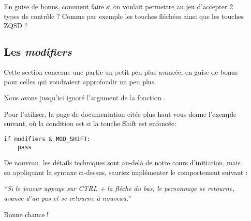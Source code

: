 En guise de bonus, comment faire si on voulait permettre au jeu d'accepter 2 types de contrôle ? Comme par exemple les touches fléchées ainsi que les touches ZQSD ?

\subsection{Les \emph{modifiers}}

Cette section concerne une partie un petit peu plus avancée, en guise de bonus pour celles qui voudraient approfondir un peu plus.

Nous avons jusqu'ici ignoré l'argument  de la fonction .

Pour l'utiliser, la page de documentation citée plus haut vous donne l'exemple suivant, où la condition est  si la touche Shift est enfoncée:

\begin{lstlisting}
if modifiers & MOD_SHIFT:
    pass
\end{lstlisting}

De nouveau, les détails techniques sont au-delà de notre cours d'initiation, mais en appliquant la syntaxe ci-dessus, sauriez implémenter le comportement suivant :

\begin{center}
\emph{``Si le joueur appuye sur CTRL + la flèche du bas, le personnage se retourne, avance d'un pas et se retourne à nouveau.''}
\end{center}

Bonne chance !


